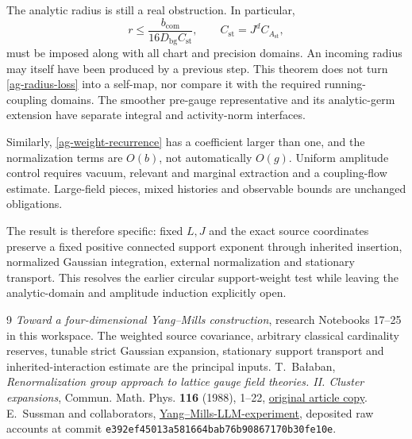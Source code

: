 \documentclass[11pt]{article}
\theoremstyle{remark}
\begin{document}
The analytic radius is still a real obstruction. In particular,
\begin{equation}\label{ag-radius-loss}
 r\le\frac{b_{\mathrm{com}}}{16D_{\mathrm{bg}}C_{\mathrm{st}}},
 \qquad C_{\mathrm{st}}=J^dC_{A_{\mathrm{st}}},
\end{equation}
must be imposed along with all chart and precision domains.
An incoming radius may itself have been produced by a
previous step. This theorem does not turn
\eqref{ag-radius-loss} into a self-map, nor compare it with
the required running-coupling domains. The smoother pre-gauge
representative and its analytic-germ extension have separate
integral and activity-norm interfaces.

Similarly, \eqref{ag-weight-recurrence} has a coefficient
larger than one, and the normalization terms are $O(b)$,
not automatically $O(g)$. Uniform amplitude control requires
vacuum, relevant and marginal extraction and a coupling-flow
estimate. Large-field pieces, mixed histories and observable
bounds are unchanged obligations.

The result is therefore specific: fixed $L,J$ and the exact
source coordinates preserve a fixed positive connected
support exponent through inherited insertion, normalized
Gaussian integration, external normalization and stationary
transport. This resolves the earlier circular support-weight
test while leaving the analytic-domain and amplitude induction
explicitly open.


\begin{thebibliography}{9}
\emph{Toward a four-dimensional Yang--Mills construction},
research Notebooks 17--25 in this workspace.
The weighted source covariance, arbitrary classical cardinality
reserves, tunable strict Gaussian expansion, stationary support
transport and inherited-interaction estimate are the principal
inputs.
T.~Ba\l aban,
\emph{Renormalization group approach to lattice gauge field
theories. II. Cluster expansions},
Commun. Math. Phys. \textbf{116} (1988), 1--22,
\href{https://scispace.com/pdf/renormalization-group-approach-to-lattice-gauge-field-4penm4k7hc.pdf}{original article copy}.
E.~Sussman and collaborators,
\href{https://github.com/ethanwsussman/Yang--Mills-LLM-experiment}{Yang--Mills-LLM-experiment},
deposited raw accounts at commit
\texttt{e392ef4501\allowbreak 3a581664ba\allowbreak b76b908671\allowbreak 70b30fe10e}.
\end{thebibliography}
\end{document}
